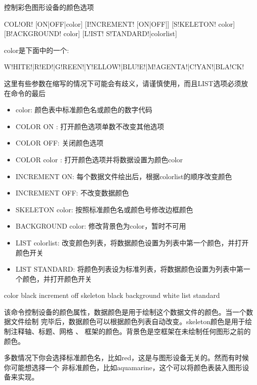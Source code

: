 \label{cmd:color}

控制彩色图形设备的颜色选项

\begin{SACSTX}
COL!OR! [ON|OFF|color] [I!NCREMENT! [ON|OFF]] [S!KELETON! color] 
    [B!ACKGROUND! color] [L!IST! S!TANDARD!|colorlist]
\end{SACSTX}
color是下面中的一个:
\begin{SACSTX}
W!HITE!|R!ED!|G!REEN!|Y!ELLOW!|BLU!E!|M!AGENTA!|C!YAN!|BLA!CK!
\end{SACSTX}
		
这里有些参数在缩写的情况下可能会有歧义，请谨慎使用，而且LIST选项必须放在命令的最后

\begin{itemize}
\item color: 颜色表中标准颜色名或颜色的数字代码
\item COLOR ON : 打开颜色选项单数不改变其他选项
\item COLOR OFF: 关闭颜色选项
\item COLOR color : 打开颜色选项并将数据设置为颜色color
\item INCREMENT ON: 每个数据文件绘出后，根据colorlist的顺序改变颜色
\item INCREMENT OFF: 不改变数据颜色 
\item SKELETON color: 按照标准颜色名或颜色号修改边框颜色
\item BACKGROUND color: 修改背景色为color，暂时不可用
\item LIST colorlist: 改变颜色列表，将数据颜色设置为列表中第一个颜色，并打开颜色开关
\item LIST STANDARD: 将颜色列表设为标准列表，将数据颜色设置为列表中第一个颜色，并打开颜色开关
\end{itemize}

\begin{SACDFT}
color black increment off skeleton black background white 
    list standard
\end{SACDFT}

该命令控制设备的颜色属性，数据颜色是用于绘制这个数据文件的颜色。当一个数据文件绘制
完毕后，数据颜色可以根据颜色列表自动改变。skeleton颜色是用于绘制注释轴、标题、网格 、
框架的颜色。背景色是空框架在未绘制任何图形之前的颜色。

多数情况下你会选择标准颜色名，比如red，这是与图形设备无关的。然而有时候你可能想选择一个
非标准颜色，比如aquamarine，这个可以将颜色表装入图形设备来实现。

